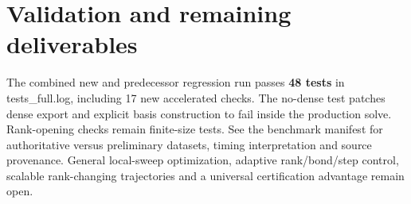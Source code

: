 \documentclass[10pt]{article}
\begin{document}
\section*{Validation and remaining deliverables}

The combined new and predecessor regression run passes \textbf{48 tests} in
tests\_full.log, including 17 new accelerated checks.
The no-dense test patches dense export and explicit basis construction to fail
inside the production solve. Rank-opening checks remain finite-size tests.
See the benchmark manifest for authoritative
versus preliminary datasets, timing interpretation and source provenance.
General local-sweep optimization, adaptive rank/bond/step control, scalable
rank-changing trajectories and a universal certification advantage remain open.
\end{document}
